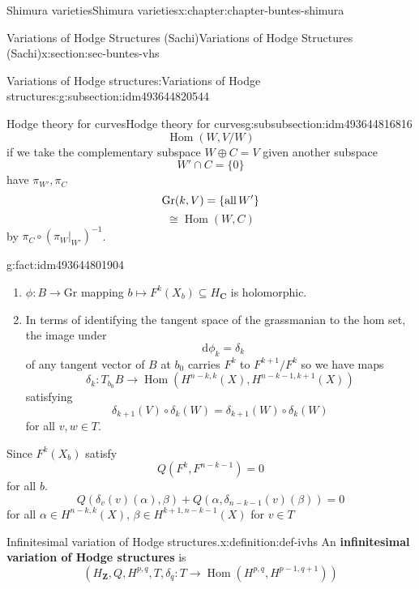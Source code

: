 \documentclass[oneside,10pt,]{book}
\newcommand{\terminology}[1]{\textbf{#1}}
\numberwithin{equation}{section}
\newcommand{\diff}{\mathop{}\!\mathrm{d}}
\newcommand{\inv}{^{-1}}
\newcommand{\ZZ}{\mathbf{Z}}
\newcommand{\CC}{\mathbf{C}}
\DeclareMathOperator{\Hom}{Hom}
\begin{document}
\begin{chapterptx}{Shimura varieties}{}{Shimura varieties}{}{}{x:chapter:chapter-buntes-shimura}
\begin{sectionptx}{Variations of Hodge Structures (Sachi)}{}{Variations of Hodge Structures (Sachi)}{}{}{x:section:sec-buntes-vhs}
\begin{subsectionptx}{Variations of Hodge structures:}{}{Variations of Hodge structures:}{}{}{g:subsection:idm493644820544}
\begin{subsubsectionptx}{Hodge theory for curves}{}{Hodge theory for curves}{}{}{g:subsubsection:idm493644816816}
\begin{equation*}
\Hom(W, V/W)
\end{equation*}
if we take the complementary subspace \(W  \oplus C = V\) given another subspace%
\begin{equation*}
W' \cap C =  \{ 0 \}
\end{equation*}
have \(\pi_{W'}, \pi_C\)%
\begin{equation*}
{\mathrm{Gr}}(k,V) = \{\text{all\,}W'\}
\end{equation*}
%
\begin{equation*}
\cong \Hom(W,C)
\end{equation*}
by \(\pi_C \circ (\pi_W|_{W'})\inv\).%
\begin{fact}{}{}{g:fact:idm493644801904}%
%
\begin{enumerate}
\item{}\(\phi\colon B\to {\mathrm{Gr}}\) mapping \(b \mapsto F^k(X_b) \subseteq H_\CC\) is holomorphic.%
\item{}In terms of identifying the tangent space of the grassmanian to the hom set, the image under%
\begin{equation*}
\diff \phi_k = \delta_k
\end{equation*}
of any tangent vector of \(B\) at \(b_0\) carries \(F^{k} \) to \(F^{k+1}/F^k\) so we have maps%
\begin{equation*}
\delta_k \colon T_{b_0} B \to \Hom(H^{n-k,k} (X), H^{n-k-1, k+1}(X))
\end{equation*}
satisfying%
\begin{equation*}
\delta_{k+1} (V) \circ \delta_k(W) =  \delta_{k+1}(W) \circ \delta_k(W)
\end{equation*}
for all \(v,w\in T\).%
\end{enumerate}
%
\end{fact}
Since \(F^k(X_b)\) satisfy%
\begin{equation*}
Q(F^k, F^{n- k - 1} ) = 0
\end{equation*}
for all \(b\).%
\begin{equation*}
Q(\delta_v(v)(\alpha), \beta) + Q(\alpha, \delta_{n-k-1}(v)(\beta)) = 0
\end{equation*}
for all \(\alpha\in H^{n-k, k}(X)\), \(\beta \in H^{k+1, n-k - 1}(X)\) for \(v \in T\)%
\begin{definition}{Infinitesimal variation of Hodge structures.}{x:definition:def-ivhs}%
An \terminology{infinitesimal variation of Hodge structures} is%
\begin{equation*}
(H_\ZZ, Q, H^{p,q}, T, \delta_q\colon T \to \Hom(H^{p,q}, H^{p-1, q+1}))

\end{equation*}
\end{definition}
\end{subsubsectionptx}
\end{subsectionptx}
\end{sectionptx}
\end{chapterptx}
\end{document}
